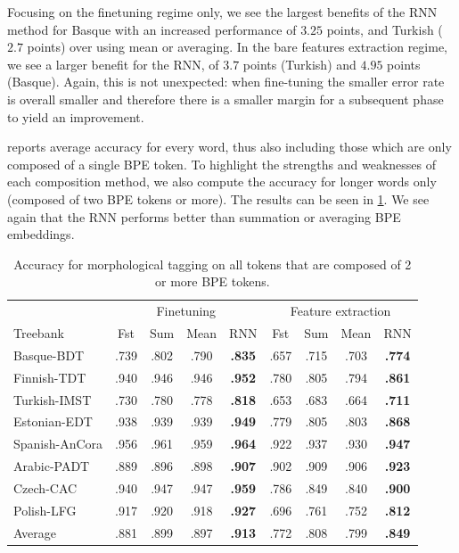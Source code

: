 \documentclass[11pt]{article}
\begin{document}
        Focusing on the finetuning regime only, we see the largest benefits of the RNN method for Basque with an
        increased performance of $3.25$ points, and Turkish ($2.7$
        points) over using mean or averaging. In the bare
        features extraction regime, we see a larger benefit for the
        RNN, of $3.7$ points (Turkish) and $4.95$ points
        (Basque). Again, this is not unexpected: when fine-tuning the
        smaller error rate is overall smaller and therefore there is a
        smaller margin for a subsequent phase to yield an improvement.

     reports average accuracy for every word,
    thus also including those which are only composed of a single BPE
    token. To highlight the strengths and weaknesses of each
    composition method, we also compute the accuracy for longer words only 
    (composed of two BPE tokens or more). The results can be seen in
    \cref{tab:results_large_tokens}.  We see again that the RNN performs
    better than summation or averaging BPE embeddings.
    
	\begin{table}%
	\centering
	\begin{tabular}{l|cccc|cccc}
		 & \multicolumn{4}{c}{Finetuning} & \multicolumn{4}{c}{Feature extraction} \\
		Treebank & Fst & Sum & Mean & RNN & Fst & Sum & Mean & RNN  \\
		 \hline
        Basque-BDT      & .739 & .802 & .790 & \textbf{.835} & .657 & .715 & .703 & \textbf{.774} \\
		Finnish-TDT     & .940 & .946 & .946 & \textbf{.952} & .780 & .805 & .794 & \textbf{.861} \\ 
		Turkish-IMST    & .730 & .780 & .778 & \textbf{.818} & .653 & .683 & .664 & \textbf{.711} \\
		Estonian-EDT    & .938 & .939 & .939 & \textbf{.949} & .779 & .805 & .803 & \textbf{.868} \\
		Spanish-AnCora  & .956 & .961 & .959 & \textbf{.964} & .922 & .937 & .930 & \textbf{.947} \\
		Arabic-PADT     & .889 & .896 & .898 & \textbf{.907} & .902 & .909 & .906 & \textbf{.923}\\
		Czech-CAC       & .940 & .947 & .947 & \textbf{.959} & .786 & .849 & .840 & \textbf{.900} \\
		Polish-LFG      & .917 & .920 & .918 & \textbf{.927} & .696 & .761 & .752 & \textbf{.812} \\
        \hline
        Average         & .881 & .899 & .897 & \textbf{.913} & .772 & .808 & .799 & \textbf{.849} \\
	\end{tabular}
    \caption{\label{tab:results_large_tokens} Accuracy for
     morphological tagging on all tokens that are composed of 2 or
     more BPE tokens.}
\end{table}
\end{document}
